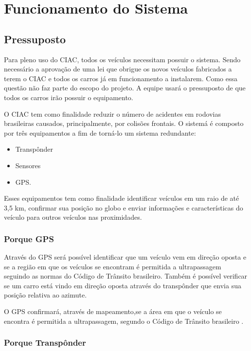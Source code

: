 \chapter[Funcionamento do Sistema]{Funcionamento do Sistema}

\section{Pressuposto}

Para pleno uso do CIAC, todos os veículos necessitam possuir o sistema. Sendo necessário a aprovação de uma lei que obrigue os novos veículos fabricados a terem o CIAC e todos os carros já em funcionamento a instalarem. Como essa questão não faz parte do escopo do projeto. A equipe usará o pressuposto de que todos os carros irão possuir o equipamento.

O CIAC tem como finalidade reduzir o número de acidentes em rodovias brasileiras causados, principalmente, por colisões frontais.
O sistemá é composto por três equipamentos a fim de torná-lo um sistema redundante:

\begin{itemize}
  \item Transpônder
  \item Sensores
  \item GPS.
\end{itemize}

Esses equipamentos  tem como finalidade identificar veículos em um raio de até 3,5 km, confirmar sua posição no globo e enviar informações e características do veículo para outros veículos nas proximidades.

\subsection{Porque GPS}

Através do GPS será possível identificar que um veículo vem em direção oposta e se a região em que os veículos se encontram é permitida a ultrapassagem seguindo as normas do Código de Trânsito brasileiro. Também é possível verificar  se um carro está vindo em direção oposta através do transpônder que envia sua posição relativa ao azimute.

O GPS confirmará, através de mapeamento,se a área em que o veículo se encontra é permitida a ultrapassagem, segundo o Código de Trânsito brasileiro \cite{ctb}.

\subsection{Porque Transpônder}

